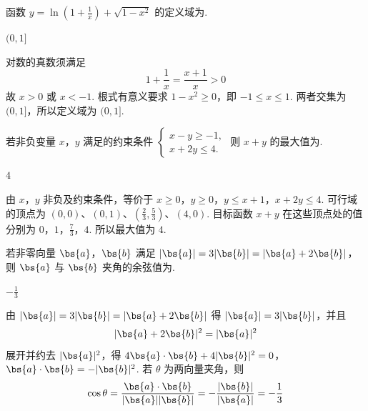 \begin{problem}
函数 \( y = \ln \left(1 + \frac{1}{x}\right) + \sqrt{1 - x^{2}} \) 的定义域为\fillinblank{}.
\end{problem}

\begin{answer}
\((0, 1]\)
\end{answer}

\begin{solution}
对数的真数须满足
\[
1+\frac1x=\frac{x+1}{x}>0
\]
故 \(x>0\) 或 \(x<-1\). 根式有意义要求 \(1-x^2\geqslant0\)，即 \(-1\leqslant x\leqslant1\). 两者交集为 \((0,1]\)，所以定义域为 \((0,1]\).
\end{solution}

\begin{problem}
若非负变量 \(x\)，\(y\) 满足的约束条件 \(\begin{cases}
x - y \geqslant -1,\\
x + 2y \leqslant 4.
\end{cases}\) 则 \(x + y\) 的最大值为\fillinblank{}.
\end{problem}

\begin{answer}
\(4\)
\end{answer}

\begin{solution}
由 \(x\)，\(y\) 非负及约束条件，等价于
\(x\geqslant0\)，\(y\geqslant0\)，\(y\leqslant x+1\)，\(x+2y\leqslant4\).
可行域的顶点为 \((0,0)\)、\((0,1)\)、\(\left(\frac23,\frac53\right)\)、\((4,0)\). 目标函数 \(x+y\) 在这些顶点处的值分别为
\(0\)，\(1\)，\(\frac73\)，\(4\).
所以最大值为 \(4\).
\end{solution}

\begin{problem}
若非零向量 \(\bs{a}\)，\(\bs{b}\) 满足 \(\lvert\bs{a}\rvert = 3\lvert\bs{b}\rvert = \lvert\bs{a} + 2\bs{b}\rvert\)，则 \(\bs{a}\) 与 \(\bs{b}\) 夹角的余弦值为\fillinblank{}.
\end{problem}

\begin{answer}
\(-\frac{1}{3}\)
\end{answer}

\begin{solution}
由 \(\lvert\bs{a}\rvert=3\lvert\bs{b}\rvert=\lvert\bs{a}+2\bs{b}\rvert\) 得 \(\lvert\bs{a}\rvert=3\lvert\bs{b}\rvert\)，并且
\[
\lvert\bs{a}+2\bs{b}\rvert^2=\lvert\bs{a}\rvert^2
\]
展开并约去 \(\lvert\bs{a}\rvert^2\)，得
\(4\bs{a}\cdot\bs{b}+4\lvert\bs{b}\rvert^2=0\)，\(\bs{a}\cdot\bs{b}=-\lvert\bs{b}\rvert^2\).
若 \(\theta\) 为两向量夹角，则
\[
\cos\theta=\frac{\bs{a}\cdot\bs{b}}{\lvert\bs{a}\rvert\lvert\bs{b}\rvert}
 =-\frac{\lvert\bs{b}\rvert}{\lvert\bs{a}\rvert}=-\frac13
\]
\end{solution}


